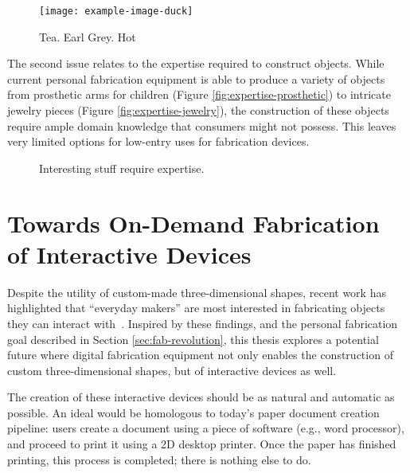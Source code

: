     \begin{figure}[h]
      \centering
      \texttt{[image: example-image-duck]}
      \label{fig:replicator}
      \caption{Tea. Earl Grey. Hot}
    \end{figure}

    The second issue relates to the expertise required to construct
     objects. While current personal fabrication equipment is
    able to produce a variety of  objects from prosthetic arms
    for children (Figure \ref{fig:expertise-prosthetic}) to intricate jewelry
    pieces (Figure \ref{fig:expertise-jewelry}), the construction of these
    objects require ample domain knowledge that consumers might not possess.
    This leaves very limited options for low-entry uses for fabrication devices.

    \begin{figure}[h]
      \centering
       \hfill
      \label{}

      \caption{Interesting stuff require expertise.}
    \end{figure}

  \section{Towards On-Demand Fabrication of Interactive Devices} \label{sec:on-demand}
    Despite the utility of custom-made three-dimensional shapes, recent work has
    highlighted that ``everyday makers'' are most interested in fabricating
    objects they can interact with~\cite{Shewbridge:2014}. Inspired by these
    findings, and the personal fabrication goal described in Section
    \ref{sec:fab-revolution}, this thesis explores a potential future where
    digital fabrication equipment not only enables the construction of custom
    three-dimensional shapes, but of interactive devices as well.

    The creation of these interactive devices should be as natural and automatic
    as possible. An ideal  would be homologous to today's paper
    document creation pipeline: users create a document using a piece of
    software (e.g., word processor), and proceed to print it using a 2D desktop
    printer. Once the paper has finished printing, this process is completed;
    there is nothing else to do.

